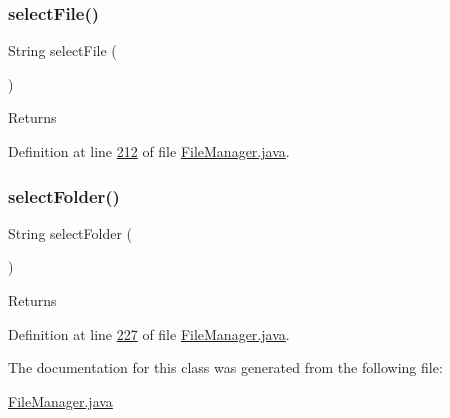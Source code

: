 \subsubsection{\texorpdfstring{select\+File()}{selectFile()}}
{\footnotesize\ttfamily String select\+File (\begin{DoxyParamCaption}{ }\end{DoxyParamCaption})}

\begin{DoxyReturn}{Returns}



\end{DoxyReturn}


Definition at line \hyperlink{_file_manager_8java_source_l00212}{212} of file \hyperlink{_file_manager_8java_source}{File\+Manager.\+java}.

\hypertarget{classfunctions_1_1_file_manager_af19fd6734ccb746c4f276c83b6a47689}{}\label{classfunctions_1_1_file_manager_af19fd6734ccb746c4f276c83b6a47689} 
\subsubsection{\texorpdfstring{select\+Folder()}{selectFolder()}}
{\footnotesize\ttfamily String select\+Folder (\begin{DoxyParamCaption}{ }\end{DoxyParamCaption})}

\begin{DoxyReturn}{Returns}

\end{DoxyReturn}


Definition at line \hyperlink{_file_manager_8java_source_l00227}{227} of file \hyperlink{_file_manager_8java_source}{File\+Manager.\+java}.



The documentation for this class was generated from the following file\+:\begin{DoxyCompactItemize}
\item 
\hyperlink{_file_manager_8java}{File\+Manager.\+java}\end{DoxyCompactItemize}
